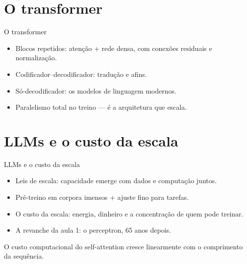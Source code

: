 \documentclass[aspectratio=169, 11pt]{beamer}
\begin{document}
\section{O transformer}

\begin{frame}{O transformer}
  \begin{itemize}\setlength{\itemsep}{0.4ex}
    \item Blocos repetidos: atenção + rede densa, com conexões residuais e
          normalização.
    \item Codificador--decodificador: tradução e afins.
    \item Só-decodificador: os modelos de linguagem modernos.
    \item Paralelismo total no treino — é a arquitetura que escala.
  \end{itemize}
\end{frame}

\section{LLMs e o custo da escala}

\begin{frame}{LLMs e o custo da escala}
  \begin{itemize}\setlength{\itemsep}{0.4ex}
    \item Leis de escala: capacidade emerge com dados e computação juntos.
    \item Pré-treino em corpora imensos + ajuste fino para tarefas.
    \item O custo da escala: energia, dinheiro e a concentração de quem pode
          treinar.
    \item A revanche da aula 1: o perceptron, 65 anos depois.
  \end{itemize}
  \begin{quizbox}
    O custo computacional do self-attention cresce linearmente com o
    comprimento da sequência.

    \smallskip
  \end{quizbox}
\end{frame}
\end{document}
